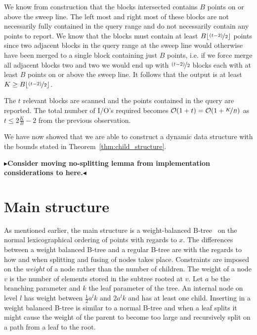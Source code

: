 \documentclass[twoside,11pt,openright]{report}
\newcommand{\todo}[1]{{\color[rgb]{.5,0,0}\textbf{$\blacktriangleright$#1$\blacktriangleleft$}}}
\begin{document}
We know from construction that the blocks intersected contains $B$ points on or above the sweep line. The left most and right most of these blocks are not necessarily fully contained in the query range and do not necessarily contain any points to report. We know that the blocks must contain at least $B\lfloor \nicefrac{(t-2)}{2}\rfloor$ points since two adjacent blocks in the query range at the sweep line would otherwise have been merged to a single block containing just $B$ points, i.e. if we force merge all adjacent blocks two and two we would end up with $\nicefrac{(t-2)}{2}$ blocks each with at least $B$ points on or above the sweep line. It follows that the output is at least $K \geq B\lfloor \nicefrac{(t-2)}{2}\rfloor$.

The $t$ relevant blocks are scanned and the points contained in the query are reported. The total number of I/O's required becomes $\mathcal{O}(1+t) = \mathcal{O}(1+\nicefrac{K}{B})$ as $t \leq 2\frac{K}{B}-2$ from the previous observation.

We have now showed that we are able to construct a dynamic data structure with the bounds stated in Theorem~\ref{thm:child_structure}.

\todo{Consider moving no-splitting lemma from implementation considerations to here.}

\section{Main structure}
\label{sec:arge_structure}
As mentioned earlier, the main structure is a weight-balanced B-tree~\cite{arge_vitter_1996} on the normal lexicographical ordering of points with regards to $x$. The differences between a weight balanced B-tree and a regular B-tree are with the regards to how and when splitting and fusing of nodes takes place. Constraints are imposed on the \textit{weight} of a node rather than the number of children. The weight of a node $v$ is the number of elements stored in the subtree rooted at $v$. Let $a$ be the branching parameter and $k$ the leaf parameter of the tree. An internal node on level $l$ has weight between $\frac{1}{2}a^lk$ and $2a^lk$ and has at least one child. Inserting in a weight balanced B-tree is similar to a normal B-tree and when a leaf splits it might cause the weight of the parent to become too large and recursively split on a path from a leaf to the root.
\end{document}

